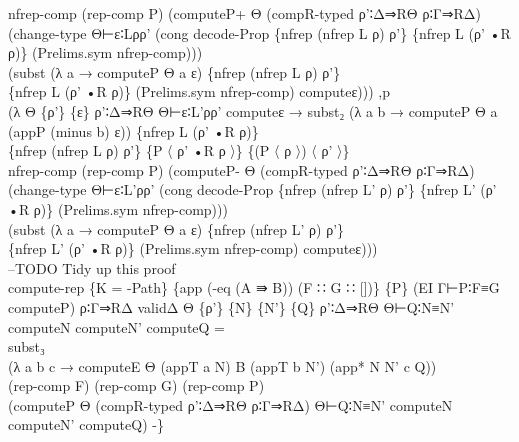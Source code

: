 {\begin{code}
{\>  nfrep-comp (rep-comp P) (computeP+ Θ (compR-typed ρ'∶Δ⇒RΘ ρ∶Γ⇒RΔ) \<\\
\>    (change-type Θ⊢ε∶Lρρ' (cong decode-Prop \{nfrep (nfrep L ρ) ρ'\} \{nfrep L (ρ' •R ρ)\} (Prelims.sym nfrep-comp))) \<\\
\>    (subst (λ a → computeP Θ a ε) \{nfrep (nfrep L ρ) ρ'\}\<\\
\>       \{nfrep L (ρ' •R ρ)\} (Prelims.sym nfrep-comp) computeε))) ,p \<\\
\>  (λ Θ \{ρ'\} \{ε\} ρ'∶Δ⇒RΘ Θ⊢ε∶L'ρρ' computeε → subst₂ (λ a b → computeP Θ a (appP (minus b) ε)) \{nfrep L (ρ' •R ρ)\}\<\\
\>                                              \{nfrep (nfrep L ρ) ρ'\} \{P 〈 ρ' •R ρ 〉\} \{(P 〈 ρ 〉) 〈 ρ' 〉\} \<\\
\>  nfrep-comp (rep-comp P) (computeP- Θ (compR-typed ρ'∶Δ⇒RΘ ρ∶Γ⇒RΔ) \<\\
\>    (change-type Θ⊢ε∶L'ρρ' (cong decode-Prop \{nfrep (nfrep L' ρ) ρ'\} \{nfrep L' (ρ' •R ρ)\} (Prelims.sym nfrep-comp))) \<\\
\>    (subst (λ a → computeP Θ a ε) \{nfrep (nfrep L' ρ) ρ'\}\<\\
\>       \{nfrep L' (ρ' •R ρ)\} (Prelims.sym nfrep-comp) computeε)))\<\\
\>--TODO Tidy up this proof\<\\
\>compute-rep \{K = -Path\} \{app (-eq (A ⇛ B)) (F ∷ G ∷ [])\} \{P\} (EI Γ⊢P∶F≡G computeP) ρ∶Γ⇒RΔ validΔ Θ \{ρ'\} \{N\} \{N'\} \{Q\} ρ'∶Δ⇒RΘ Θ⊢Q∶N≡N' computeN computeN' computeQ = \<\\
\>  subst₃\<\\
\>    (λ a b c → computeE Θ (appT a N) B (appT b N') (app* N N' c Q)) \<\\
\>    (rep-comp F) (rep-comp G) (rep-comp P) \<\\
\>    (computeP Θ (compR-typed ρ'∶Δ⇒RΘ ρ∶Γ⇒RΔ) Θ⊢Q∶N≡N' computeN computeN' computeQ) -\}}\<%
\end{code}
}

\begin{code}%
\>  \AgdaSymbol{:}  \AgdaSymbol{\{}   \AgdaSymbol{\}} \AgdaSymbol{\{} \AgdaSymbol{:}   \AgdaSymbol{\}} \AgdaSymbol{\{}\AgdaSymbol{\}} \AgdaSymbol{\{} \AgdaSymbol{:}   \AgdaSymbol{(} \AgdaSymbol{)\}} \AgdaSymbol{\{} \AgdaSymbol{:}   \AgdaSymbol{(} \AgdaSymbol{)\}}  \<[111]%
\>[111]\<%
\\
\>[0]\<[16]%
\>[16]                \AgdaSymbol{(}   \AgdaSymbol{)} \AgdaSymbol{(}   \AgdaSymbol{)}\<%
\end{code}


